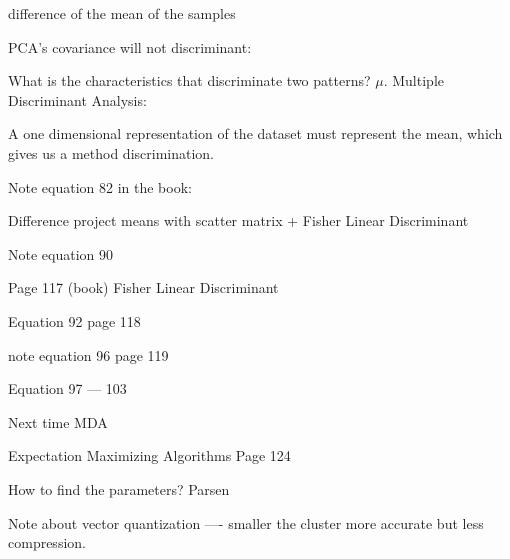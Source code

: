 difference of the mean of the samples

PCA's covariance will not discriminant: 

What is the characteristics that discriminate two patterns?  $\mu$.  Multiple Discriminant Analysis:  

A one dimensional representation of the dataset must represent the mean, which gives us a method discrimination.  


Note equation 82 in the book:


Difference project means with scatter matrix + Fisher Linear Discriminant

Note equation 90

Page 117 (book)   Fisher Linear Discriminant

Equation 92 page 118

note equation 96 page 119


Equation 97 --- 103

Next time MDA  


Expectation Maximizing Algorithms  Page 124 


How to find the parameters?  Parsen~  


Note about vector quantization ----   smaller the cluster more accurate but less compression.  